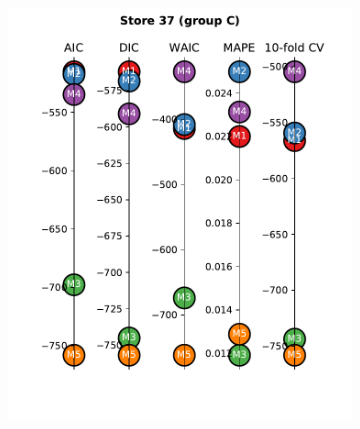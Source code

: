 \documentclass[english, 12pt, a4paper, sci, utf8, a-1b, online]{aaltothesis}
\begin{document}
\begin{abstractpage}[english]
\begin{figure}[hbt]
	\begin{subfigure}[htb]{0.3\textwidth}
		\centering
		\includegraphics[width=\textwidth]{../plots/metrics/metrics_plot_single_store_37_of_C.pdf}
	\end{subfigure}
	\hfill 
	\begin{subfigure}[htb]{0.3\textwidth}
		\centering

\end{subfigure}
\end{figure}
\end{abstractpage}
\end{document}

